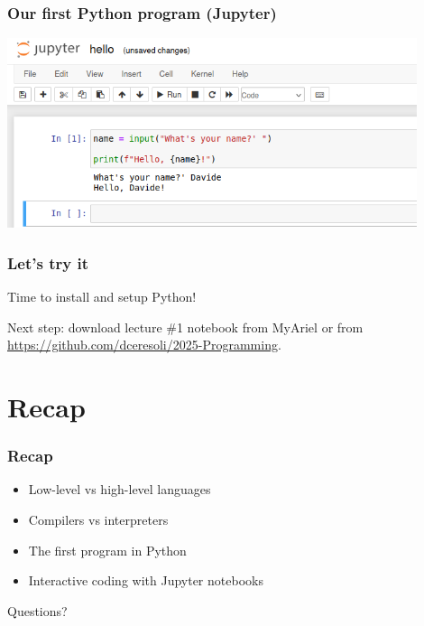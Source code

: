 \documentclass[handout]{beamer}
\begin{document}
\begin{frame}[fragile]
  \frametitle{Our first Python program (Jupyter)}
  \begin{center}
  \includegraphics[width=0.9\textwidth]{hello_jupyter.png}
  \end{center}
\end{frame}


\begin{frame}[fragile]
  \frametitle{Let's try it}
  \begin{center}
  \Huge{Time to install and setup Python!}
  \end{center}
  \vspace{2cm}
  \begin{center}
  Next step: download lecture \#1 notebook from MyAriel or from \url{https://github.com/dceresoli/2025-Programming}.
  \end{center}
\end{frame}



\section{Recap}
\begin{frame}[fragile]
  \frametitle{Recap}
  \begin{itemize}
  \item Low-level vs high-level languages\pause
  \item Compilers vs interpreters\pause
  \item The first program in Python\pause
  \item Interactive coding with Jupyter notebooks\pause
  \end{itemize}
  \begin{block}{}
  \begin{center}Questions?\end{center}
  \end{block}
\end{frame}


\end{document}

